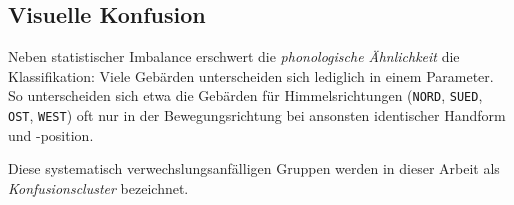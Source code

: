 \subsection{Visuelle Konfusion}

Neben statistischer Imbalance erschwert die \textit{phonologische Ähnlichkeit} die Klassifikation: Viele Gebärden unterscheiden sich lediglich in einem Parameter. So unterscheiden sich etwa die Gebärden für Himmelsrichtungen (\texttt{NORD}, \texttt{SUED}, \texttt{OST}, \texttt{WEST}) oft nur in der Bewegungsrichtung bei ansonsten identischer Handform und -position.

Diese systematisch verwechslungsanfälligen Gruppen werden in dieser Arbeit als \textit{Konfusionscluster} bezeichnet.